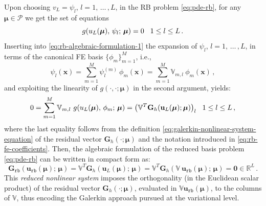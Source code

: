 \documentclass[12pt, a4paper, twoside, openright, notitlepage]{report}
\numberwithin{equation}{chapter}
\theoremstyle{theorem}
\theoremstyle{definition}
\theoremstyle{remark}
\theoremstyle{proposition}
\numberwithin{figure}{chapter}
\newcommand{\bg}[1]{\boldsymbol{#1}}
\begin{document}
		Upon choosing $v_{L} = \psi_l$, $l = 1, \, \ldots \, , L$, in the RB problem \eqref{eq:pde-rb}, for any $\bg{\mu} \in \mathcal{P}$ we get the set of equations
		\begin{equation}
			\label{eq:rb-algebraic-formulation-1}
			g(u_{L}(\bg{\mu}), \, \psi_l; \, \bg{\mu}) = 0 \hspace*{0.3cm} 1 \leq l \leq L \, .
		\end{equation}
		Inserting into \eqref{eq:rb-algebraic-formulation-1} the expansion of $\psi_l$, $l = 1, \, \ldots \, , L$, in terms of the canonical FE basis $\big\lbrace \phi_m \big\rbrace_{m = 1}^M$, i.e.,
		\begin{equation*}
			\psi_l(\bg{x}) = \sum_{m = 1}^M \psi_l^{(m)} ~ \phi_m(\bg{x}) = \sum_{m = 1}^M \mathbb{V}_{m,l} ~ \phi_m(\bg{x}) \, ,
		\end{equation*} 
		and exploiting the linearity of $g(\cdot,\cdot; \bg{\mu})$ in the second argument, yields:
		\begin{equation*}
			0 = \sum_{m = 1}^M \mathbb{V}_{m,l} ~ g(u_L(\bg{\mu}), \, \phi_m; \, \bg{\mu}) = \big( \mathbb{V}^T \mathbf{G}_h(\mathbf{u}_L(\bg{\mu}); \bg{\mu}) \big)_l \hspace*{0.3cm} 1 \leq l \leq L \, ,
		\end{equation*}
		where the last equality follows from the definition \eqref{eq:galerkin-nonlinear-system-equation} of the residual vector $\mathbf{G}_h(\cdot; \bg{\mu})$ and the notation introduced in \eqref{eq:rb-fe-coefficients}. Then, the algebraic formulation of the reduced basis problem \eqref{eq:pde-rb} can be written in compact form as:
		\begin{equation}
			\label{eq:rb-nonlinear-system}
			\mathbf{G}_{\texttt{rb}}(\mathbf{u}_{\texttt{rb}}(\bg{\mu}); \, \bg{\mu}) = \mathbb{V}^T \mathbf{G}_h(\mathbf{u}_L(\bg{\mu}); \, \bg{\mu}) = \mathbb{V}^T \mathbf{G}_h(\mathbb{V} ~ \mathbf{u}_{\texttt{rb}}(\bg{\mu}); \, \bg{\mu}) = \bg{0} \in \mathbb{R}^L \, .
		\end{equation}
		This \emph{reduced nonlinear system} imposes the orthogonality (in the Euclidean scalar product) of the residual vector $\mathbf{G}_h(\cdot; \bg{\mu})$, evaluated in $\mathbb{V} \mathbf{u}_{\texttt{rb}}(\bg{\mu})$, to the columns of $\mathbb{V}$, thus encoding the Galerkin approach pursued at the variational level.
		
\end{document}
